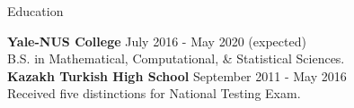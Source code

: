 \documentclass{resume} %
\begin{document}
\begin{rSection}{Education}

{\bf Yale-NUS College} \hfill { July 2016 - May 2020 (expected)} \\ 
B.S. in Mathematical, Computational, \& Statistical Sciences. \\

{\bf Kazakh Turkish High School} \hfill { September 2011 - May 2016} \\ 
Received five distinctions for National Testing Exam. \\
\end{rSection}
\end{document}
